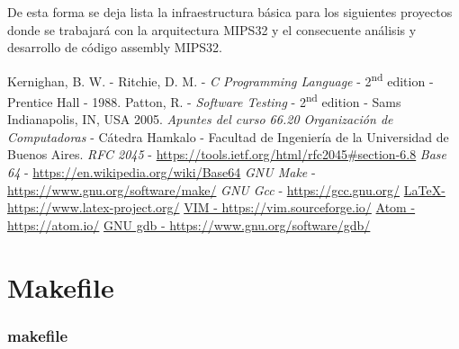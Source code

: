 De esta forma se deja lista la infraestructura básica para los siguientes proyectos donde se trabajará con la arquitectura MIPS32 y el consecuente análisis y desarrollo de código assembly MIPS32.
\clearpage
\begin{thebibliography}{10}
	 Kernighan, B. W. - Ritchie, D. M. - \emph{C Programming Language} - 2\textsuperscript{nd} edition - Prentice Hall - 1988.
	 Patton, R. - \emph{Software Testing} - 2\textsuperscript{nd} edition - Sams Indianapolis, IN, USA 2005.
	 \emph{Apuntes del curso 66.20 Organización de Computadoras} - Cátedra Hamkalo - Facultad de Ingeniería de la Universidad de Buenos Aires.
	 \emph{RFC 2045} - \hyperlink{make}{https://tools.ietf.org/html/rfc2045\#section-6.8}
	 \emph{Base 64} - \hyperlink{make}{https://en.wikipedia.org/wiki/Base64}
	 \emph{GNU Make} - \hyperlink{make}{https://www.gnu.org/software/make/}
	 \emph{GNU Gcc} - \hyperlink{gcc}{https://gcc.gnu.org/}
	\href{https://www.latex-project.org/}{\LaTeX - https://www.latex-project.org/}
	\href{https://vim.sourceforge.io/}{VIM - https://vim.sourceforge.io/}
	\href{https://atom.io/}{Atom - https://atom.io/}
	\href{https://www.gnu.org/software/gdb/}{GNU gdb - https://www.gnu.org/software/gdb/}
\end{thebibliography}
\clearpage

\appendix
\section{Makefile}\label{appendix_makefile}

\subsubsection{makefile}\label{app_makefile}

\clearpage

